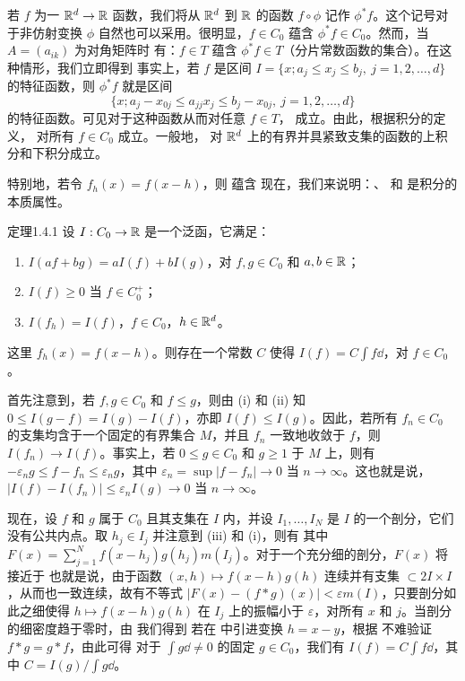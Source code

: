 若 $f$ 为一 $\mathbb R^d\to\mathbb R$ 函数，我们将从 $\mathbb R^d$ 到 $\mathbb R$ 的函数 $f\circ\phi$ 记作 $\phi^*f$。这个记号对于非仿射变换 $\phi$ 自然也可以采用。很明显，$f\in C_0$ 蕴含 $\phi^*f\in C_0$。然而，当 $A=(a_{ik})$ 为对角矩阵时
有：$f\in T$ 蕴含 $\phi^*f\in T$（分片常数函数的集合）。在这种情形，我们立即得到
事实上，若 $f$ 是区间 $I=\{x;a_j\le x_j\le b_j,\ j=1,2,\ldots,d\}$ 的特征函数，则 $\phi^*f$ 就是区间
\[\{x;a_j-x_{0j}\le a_{jj}x_j\le b_j-x_{0j},\ j=1,2,\ldots,d\}\]
的特征函数。可见对于这种函数从而对任意 $f\in T$， 成立。由此，根据积分的定义， 对所有 $f\in C_0$ 成立。一般地， 对 $\mathbb R^d$ 上的有界并具紧致支集的函数的上积分和下积分成立。

特别地，若令 $f_h(x)=f(x-h)$，则  蕴含
现在，我们来说明：、 和  是积分的本质属性。
\begin{statement}{定理}{1.4.1}
设 $I:C_0\to\mathbb R$ 是一个泛函，它满足：
\begin{enumerate}[label=(\roman*)]
\item $I(af+bg)=aI(f)+bI(g)$，对 $f,g\in C_0$ 和 $a,b\in\mathbb R$；
\item $I(f)\ge0$ 当 $f\in C_0^+$；
\item $I(f_h)=I(f)$，$f\in C_0$，$h\in\mathbb R^d$。
\end{enumerate}
这里 $f_h(x)=f(x-h)$。则存在一个常数 $C$ 使得 $I(f)=C\int f\dd$，对 $f\in C_0$。
\end{statement}
\Proof 首先注意到，若 $f,g\in C_0$ 和 $f\le g$，则由 (i) 和 (ii) 知 $0\le I(g-f)=I(g)-I(f)$，亦即 $I(f)\le I(g)$。因此，若所有 $f_n\in C_0$ 的支集均含于一个固定的有界集合 $M$，并且 $f_n$ 一致地收敛于 $f$，则 $I(f_n)\to I(f)$。事实上，若 $0\le g\in C_0$ 和 $g\ge1$ 于 $M$ 上，则有 $-\varepsilon_ng\le f-f_n\le\varepsilon_ng$，其中 $\varepsilon_n=\sup|f-f_n|\to0$ 当 $n\to\infty$。这也就是说，
$|I(f)-I(f_n)|\le\varepsilon_n I(g)\to0$ 当 $n\to\infty$。

现在，设 $f$ 和 $g$ 属于 $C_0$ 且其支集在 $I$ 内，并设 $I_1,\ldots,I_N$ 是 $I$ 的一个剖分，它们没有公共内点。取 $h_j\in I_j$ 并注意到 (iii) 和 (i)，则有
其中 $F(x)=\sum_{j=1}^N f(x-h_j)g(h_j)m(I_j)$。对于一个充分细的剖分，$F(x)$ 将接近于
也就是说，由于函数 $(x,h)\mapsto f(x-h)g(h)$ 连续并有支集 $\subset2I\times I$，从而也一致连续，故有不等式 $|F(x)-(f*g)(x)|<\varepsilon m(I)$，只要剖分如此之细使得 $h\mapsto f(x-h)g(h)$ 在 $I_j$ 上的振幅小于 $\varepsilon$，对所有 $x$ 和 $j$。当剖分的细密度趋于零时，由  我们得到
若在  中引进变换 $h=x-y$，根据  不难验证 $f*g=g*f$，由此可得
对于 $\int g\dd\ne0$ 的固定 $g\in C_0$，我们有 $I(f)=C\int f\dd$，其中 $C=I(g)/\int g\dd$。

